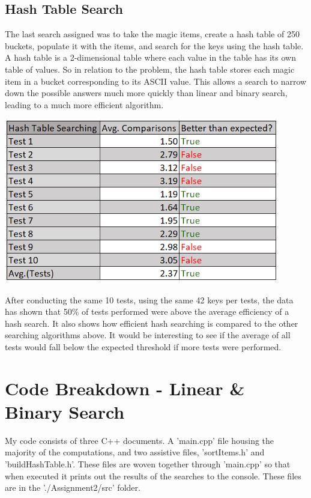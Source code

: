 \documentclass[12pt, letterpaper]{article}
\begin{document}
\subsection{Hash Table Search} \label{HshTblSch}
The last search assigned was to take the magic items, create a hash table of 250 buckets, populate it with the items, and search for the keys using the hash table.
A hash table is a 2-dimensional table where each value in the table has its own table of values.
\newline
\indent So in relation to the problem, the hash table stores each magic item in a bucket corresponding to its ASCII value.
This allows a search to narrow down the possible answers much more quickly than linear and binary search, leading to a much more efficient algorithm.
\begin{center}
   \includegraphics[width=120mm,scale=0.5]{HshSearch.png}
\end{center}
After conducting the same 10 tests, using the same 42 keys per tests, the data has shown that 50\% of tests performed were above the average efficiency of a hash search.
It also shows how efficient hash searching is compared to the other searching algorithms above.
It would be interesting to see if the average of all tests would fall below the expected threshold if more tests were performed.
\newpage

\section{Code Breakdown - Linear \& Binary Search}
My code consists of three C++ documents. 
A 'main.cpp' file housing the majority of the computations, and two assistive files, 'sortItems.h' and 'buildHashTable.h'.
These files are woven together through 'main.cpp' so that when executed it prints out the results of the searches to the console.
These files are in the './Assignment2/src' folder.
\end{document}
